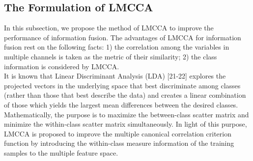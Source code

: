 \documentclass[journal]{IEEEtran}
\begin{document}
\subsection{The Formulation of LMCCA}
In this subsection, we propose the method of LMCCA to improve the performance of information fusion. The advantages of LMCCA for information fusion rest on the following facts: 1) the correlation among the variables in multiple channels is taken as the metric of their similarity; 2) the class information is considered by LMCCA. \\\indent It is known that Linear Discriminant Analysis (LDA) [21-22] explores the projected vectors in the underlying space that best discriminate among classes (rather than those that best describe the data) and creates a linear combination of those which yields the largest mean differences between the desired classes. Mathematically, the purpose is to maximize the between-class scatter matrix and minimize the within-class scatter matrix simultaneously. In light of this purpose, LMCCA is proposed to improve the multiple canonical correlation criterion function by introducing the within-class measure information of the training samples to the multiple feature space. \\\indent
\end{document}
